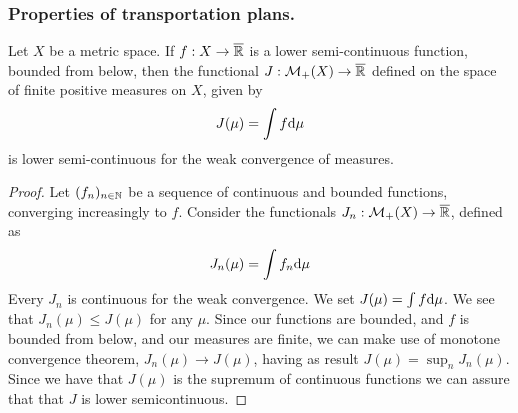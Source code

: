 \subsubsection{Properties of transportation plans.}

\begin{lemma}
	Let $X$ be a metric space. If $f:X\rightarrow\overline{\mathbb{R}}$ is a lower semi-continuous function, bounded from below, then the functional  $J:\mathcal{M}_+(X)\rightarrow \overline{\mathbb{R}}$ defined on the space of finite positive measures on $X$, given by
	\begin{equation*}
	J(\mu)=\int f \mathrm{d}\mu
	\end{equation*} 
	is lower semi-continuous for the weak convergence of measures. \label{lemma: Monotone Convergence implies l.s.c}
\end{lemma}
\begin{proof}
	Let $(f_n)_{n\in \mathbb{N}}$ be a sequence of continuous and bounded functions, converging increasingly to $f$. Consider the functionals $J_n: \mathcal{M}_+(X)\rightarrow\overline{\mathbb{R}}$, defined as
	\begin{equation*}
	J_n(\mu)=\int f_n \mathrm{d}\mu
	\end{equation*}	
	Every $J_n$ is continuous for the weak convergence. We set $J(\mu)=\int f \mathrm{d}\mu$. We see that $J_n(\mu) \leq J(\mu)$ for any $\mu$. Since our functions are bounded, and $f$ is bounded from below, and our measures are finite, we can make use of monotone convergence theorem, $J_n(\mu)\rightarrow J(\mu)$, having as result $J(\mu)=\sup_{n} J_n(\mu)$. Since we have that $J(\mu)$ is the supremum of continuous functions we can assure that that $J$ is lower semicontinuous.
\end{proof}
